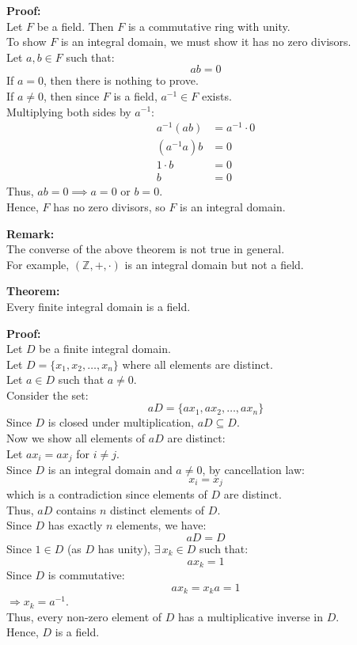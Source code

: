 \documentclass[11pt]{article}
\begin{document}
\medskip
\noindent \textbf{Proof:} \\
Let $F$ be a field. Then $F$ is a commutative ring with unity. \\
To show $F$ is an integral domain, we must show it has no zero divisors. \\
Let $a, b \in F$ such that:
\[
ab = 0
\]
If $a = 0$, then there is nothing to prove. \\
If $a \ne 0$, then since $F$ is a field, $a^{-1} \in F$ exists. \\
Multiplying both sides by $a^{-1}$:
\begin{align*}
a^{-1}(ab) &= a^{-1} \cdot 0 \\
(a^{-1}a)b &= 0 \\
1 \cdot b &= 0 \\
b &= 0
\end{align*}
Thus, $ab = 0 \implies a = 0$ or $b = 0$. \\
Hence, $F$ has no zero divisors, so $F$ is an integral domain.

\newpage
\noindent \textbf{Remark:} \\
The converse of the above theorem is not true in general. \\
For example, $(\mathbb{Z}, +, \cdot)$ is an integral domain but not a field.

\bigskip
\noindent \textbf{Theorem:} \\
Every finite integral domain is a field.

\medskip
\noindent \textbf{Proof:} \\
Let $D$ be a finite integral domain. \\
Let $D = \{x_1, x_2, \dots, x_n\}$ where all elements are distinct. \\
Let $a \in D$ such that $a \ne 0$. \\
Consider the set:
\[
aD = \{a x_1, a x_2, \dots, a x_n\}
\]
Since $D$ is closed under multiplication, $aD \subseteq D$. \\
Now we show all elements of $aD$ are distinct: \\
Let $a x_i = a x_j$ for $i \ne j$. \\
Since $D$ is an integral domain and $a \ne 0$, by cancellation law:
\[
x_i = x_j
\]
which is a contradiction since elements of $D$ are distinct. \\
Thus, $aD$ contains $n$ distinct elements of $D$. \\
Since $D$ has exactly $n$ elements, we have:
\[
aD = D
\]
Since $1 \in D$ (as $D$ has unity), $\exists\, x_k \in D$ such that:
\[
a x_k = 1
\]
Since $D$ is commutative:
\[
a x_k = x_k a = 1
\]
$\Rightarrow x_k = a^{-1}$. \\
Thus, every non-zero element of $D$ has a multiplicative inverse in $D$. \\
Hence, $D$ is a field.
\end{document}
